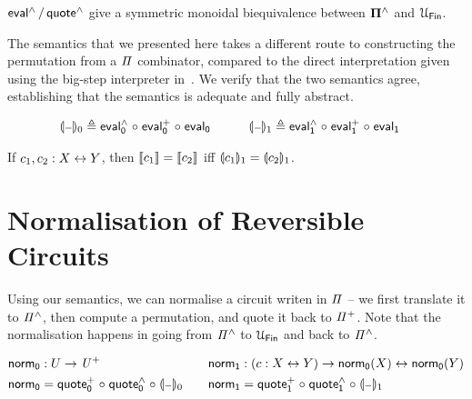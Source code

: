 \begin{proposition}
  $\evalh/\quoteh$ give a symmetric monoidal biequivalence between $\mathbf{\Pi^{\wedge}}$ and $\UFin$.
\end{proposition}

The semantics that we presented here takes a different route to constructing the permutation from a $\mathit{\Pi}$
combinator, compared to the direct interpretation given using the big-step interpreter in~. We
verify that the two semantics agree, establishing that the semantics is adequate and fully abstract.

\begin{definition}
  \begin{gather*}
    \begin{aligned}
      \gdenot{\blank}_{0} &\defeq \evalh_{0} \comp \evalp_{0} \comp \evalt_{0}
    \end{aligned}
    \qquad
    \begin{aligned}
      \gdenot{\blank}_{1} &\defeq \evalh_{1} \comp \evalp_{1} \comp \evalt_{1}
    \end{aligned}
  \end{gather*}
\end{definition}

\begin{proposition}
  If $c_1, c_2 : X \mathrel{\leftrightarrow} Y$, then $\llbracket c_1\rrbracket = \llbracket c_2\rrbracket$ iff $\llparenthesis c_1\rrparenthesis_{1} = \llparenthesis c_2\rrparenthesis_{1}$.
\end{proposition}

\section{Normalisation of Reversible Circuits}
\label{sec:applications}

Using our semantics, we can normalise a circuit writen in $\mathit{\Pi}$ -- we first translate it to $\mathit{{\Pi}^{\wedge}}$, then
compute a permutation, and quote it back to $\mathit{{\Pi}^{+}}$. Note that the normalisation happens in going from
$\mathit{{\Pi}^{\wedge}}$ to $\UFin$ and back to $\mathit{{\Pi}^{\wedge}}$.

\begin{definition}
  \begin{gather*}
    \begin{aligned}
      \normt_{0} & : U \to \UPlus                                            \\
      \normt_{0} & = \quotep_{0} \comp \quoteh_{0} \comp \gdenot{\blank}_{0}
    \end{aligned}
    \qquad
    \begin{aligned}
      \normt_{1} & : (c : X \iso Y) \to \normt_{0}(X) \iso \normt_{0}(Y)     \\
      \normt_{1} & = \quotep_{1} \comp \quoteh_{1} \comp \gdenot{\blank}_{1}
    \end{aligned}
  \end{gather*}
\end{definition}

